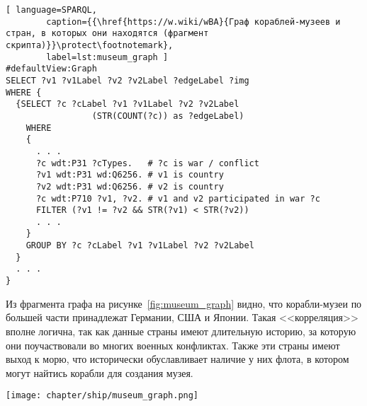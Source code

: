 \begin{lstlisting}[ language=SPARQL, 
        caption={{\href{https://w.wiki/wBA}{Граф кораблей-музеев и стран, в которых они находятся (фрагмент скрипта)}}\protect\footnotemark}, 
        label=lst:museum_graph ]
#defaultView:Graph
SELECT ?v1 ?v1Label ?v2 ?v2Label ?edgeLabel ?img
WHERE {
  {SELECT ?c ?cLabel ?v1 ?v1Label ?v2 ?v2Label 
                 (STR(COUNT(?c)) as ?edgeLabel) 
    WHERE
    {
      . . .
      ?c wdt:P31 ?cTypes.   # ?c is war / conflict
      ?v1 wdt:P31 wd:Q6256. # v1 is country
      ?v2 wdt:P31 wd:Q6256. # v2 is country
      ?c wdt:P710 ?v1, ?v2. # v1 and v2 participated in war ?c
      FILTER (?v1 != ?v2 && STR(?v1) < STR(?v2)) 
      . . .
    }
    GROUP BY ?c ?cLabel ?v1 ?v1Label ?v2 ?v2Label
  }
  . . .
}
\end{lstlisting}

Из фрагмента графа на рисунке~\ref{fig:museum_graph} видно, 
что корабли-музеи по большей части принадлежат Германии, США и Японии. 
Такая <<корреляция>> вполне логична, так как данные страны имеют длительную историю, 
за которую они поучаствовали во многих военных конфликтах. 
Также эти страны имеют выход к морю, что исторически обуславливает наличие у них флота, 
в котором могут найтись корабли для создания музея.

\begin{figure*}[ht]
  \texttt{[image: chapter/ship/museum\_graph.png]}
  \caption[Граф стран и кораблей-музеев]{Фрагмент графа стран, кораблей-музеев и конфликтов, построенный по скрипту~\protect\ref{lst:museum_graph}.}%
  \label{fig:museum_graph}%
\end{figure*}

